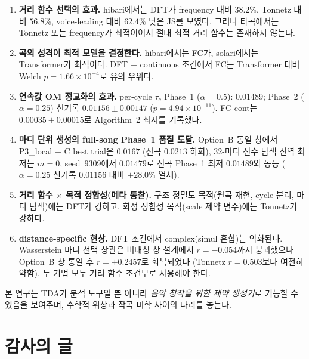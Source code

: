 \documentclass[11pt,a4paper]{article}
\begin{document}
\begin{enumerate}
\item \textbf{거리 함수 선택의 효과.}
      hibari에서는 DFT가 frequency 대비 $38.2\%$,
      Tonnetz 대비 $56.8\%$, voice-leading 대비 $62.4\%$ 낮은 JS를 보였다.
      그러나 타곡에서는 Tonnetz 또는 frequency가 최적이어서
      절대 최적 거리 함수는 존재하지 않는다.

\item \textbf{곡의 성격이 최적 모델을 결정한다.}
      hibari에서는 FC가, solari에서는 Transformer가 최적이다.
      DFT + continuous 조건에서 FC는 Transformer 대비
      Welch $p = 1.66 \times 10^{-4}$로 유의 우위다.

\item \textbf{연속값 OM 정교화의 효과.}
      per-cycle $\tau_c$ Phase~1 ($\alpha=0.5$): $0.01489$;
      Phase~2 ($\alpha=0.25$) 신기록 $\mathbf{0.01156 \pm 0.00147}$ ($p=4.94\times10^{-11}$).
      FC-cont는 $0.00035 \pm 0.00015$로 Algorithm~2 최저를 기록했다.

\item \textbf{마디 단위 생성의 full-song Phase~1 품질 도달.}
      Option~B 동일 창에서 P3\_local + C best trial은 $\mathbf{0.0167}$ (전곡 $0.0213$ 하회),
      32-마디 전수 탐색 전역 최저는 $m=0$, seed~9309에서 $\mathbf{0.01479}$로
      전곡 Phase~1 최저 $0.01489$와 동등 ($\alpha=0.25$ 신기록 $0.01156$ 대비 $+28.0\%$ 열세).

\item \textbf{거리 함수 $\times$ 목적 정합성(메타 통찰).}
      구조 정밀도 목적(원곡 재현, cycle 분리, 마디 탐색)에는 DFT가 강하고,
      화성 정합성 목적(scale 제약 변주)에는 Tonnetz가 강하다.

\item \textbf{distance-specific 현상.}
      DFT 조건에서 complex(simul 혼합)는 악화된다.
      Wasserstein 마디 선택 상관은 비대칭 창 설계에서 $r=-0.054$까지 붕괴했으나
      Option~B 창 통일 후 $r=+0.2457$로 회복되었다 (Tonnetz $r=0.503$보다 여전히 약함).
      두 기법 모두 거리 함수 조건부로 사용해야 한다.
\end{enumerate}

본 연구는 TDA가 분석 도구일 뿐 아니라 \emph{음악 창작을 위한
제약 생성기}로 기능할 수 있음을 보여주며,
수학적 위상과 작곡 미학 사이의 다리를 놓는다.


\section*{감사의 글}
\end{document}
